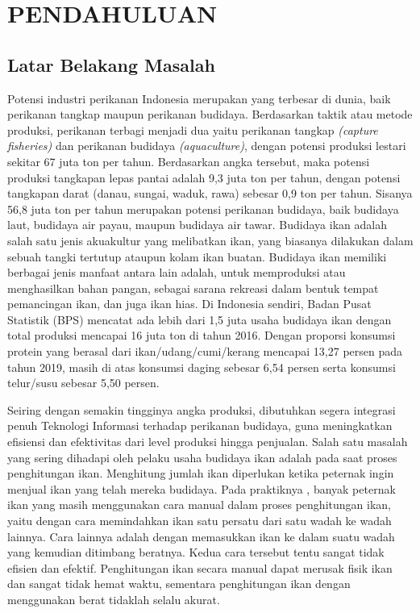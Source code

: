 
\chapter{PENDAHULUAN}

\section{Latar Belakang Masalah}
    Potensi industri perikanan Indonesia merupakan yang terbesar di dunia, baik perikanan tangkap maupun perikanan budidaya. Berdasarkan taktik atau metode produksi, perikanan terbagi menjadi dua yaitu perikanan tangkap \textit{(capture fisheries)} dan perikanan budidaya \textit{(aquaculture)}, dengan potensi produksi lestari sekitar 67 juta ton per tahun. Berdasarkan angka tersebut, maka potensi produksi tangkapan lepas pantai adalah 9,3 juta ton per tahun, dengan potensi tangkapan darat (danau, sungai, waduk,  rawa) sebesar 0,9 ton per tahun. Sisanya 56,8 juta ton per tahun merupakan potensi perikanan budidaya,  baik budidaya laut, budidaya air payau, maupun budidaya air tawar. Budidaya ikan adalah salah satu jenis akuakultur yang melibatkan ikan, yang biasanya dilakukan dalam sebuah tangki tertutup ataupun kolam ikan buatan. Budidaya ikan memiliki berbagai jenis manfaat antara lain adalah, untuk memproduksi atau menghasilkan bahan pangan, sebagai sarana rekreasi dalam bentuk tempat pemancingan ikan, dan juga ikan hias. Di Indonesia sendiri, Badan Pusat Statistik (BPS) mencatat ada lebih dari 1,5 juta usaha budidaya ikan dengan total produksi mencapai 16 juta ton di tahun 2016. Dengan proporsi konsumsi protein yang berasal dari ikan/udang/cumi/kerang mencapai 13,27 persen pada tahun 2019, masih di atas konsumsi daging sebesar 6,54 persen serta konsumsi telur/susu sebesar 5,50 persen.

    Seiring dengan semakin tingginya angka produksi, dibutuhkan segera integrasi penuh Teknologi Informasi terhadap perikanan budidaya, guna meningkatkan efisiensi dan efektivitas dari level produksi hingga penjualan. Salah satu masalah yang sering dihadapi oleh pelaku usaha budidaya ikan adalah pada saat proses penghitungan ikan. Menghitung jumlah ikan diperlukan ketika peternak ingin menjual ikan yang telah mereka budidaya. Pada praktiknya \citep{AlAmri2020}, banyak peternak ikan yang masih menggunakan cara manual dalam proses penghitungan ikan, yaitu dengan cara memindahkan ikan satu persatu dari satu wadah ke wadah lainnya. Cara lainnya adalah dengan memasukkan ikan ke dalam suatu wadah yang kemudian ditimbang beratnya. Kedua cara tersebut tentu sangat tidak efisien dan efektif. Penghitungan ikan secara manual dapat merusak fisik ikan dan sangat tidak hemat waktu, sementara penghitungan ikan dengan menggunakan berat tidaklah selalu akurat.
    

